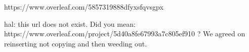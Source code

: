 
https://www.overleaf.com/5857319888dfyxsfqvsgpx

hal: this url does not exist. Did you mean:
https://www.overleaf.com/project/5d40a8fe67993a7c805ef910 ?
We agreed on reinserting not copying and then weeding out.

